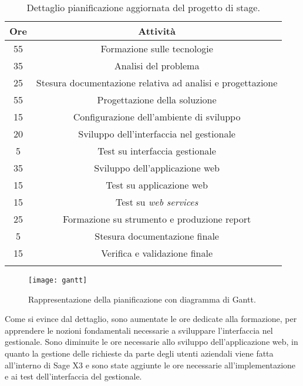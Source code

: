 \begin{center}
\begin{longtable}{ | c| c|}
	\hline
	\textbf{Ore} & \textbf{Attività}\\
	\hline
	55 & Formazione sulle tecnologie\\
	\hline
	35 & Analisi del problema\\
	\hline
	25 & Stesura documentazione relativa ad analisi e progettazione\\
	\hline
	55 & Progettazione della soluzione\\
	\hline
	15 & Configurazione dell'ambiente di sviluppo\\
	\hline
	20 & Sviluppo dell'interfaccia nel gestionale\\
	\hline
	5 & Test su interfaccia gestionale\\
	\hline
	35 & Sviluppo dell'applicazione web\\
	\hline
	15 & Test su applicazione web\\
	\hline
	15 & Test su \textit{web services}\\
	\hline
	25 & Formazione su strumento e produzione report\\
	\hline
	5 & Stesura documentazione finale\\
	\hline
	15 & Verifica e validazione finale\\
	\hline
	\caption{Dettaglio pianificazione aggiornata del progetto di stage.}
\end{longtable}
\end{center}

\begin{figure}[htbp]
	\begin{center}
		\texttt{[image: gantt]}
		\caption{Rappresentazione della pianificazione con diagramma di Gantt.}
	\end{center}
\end{figure}

Come si evince dal dettaglio, sono aumentate le ore dedicate alla formazione, per apprendere le nozioni fondamentali necessarie a sviluppare l'interfaccia nel gestionale. Sono diminuite le ore necessarie allo sviluppo dell'applicazione web, in quanto la gestione delle richieste da parte degli utenti aziendali viene fatta all'interno di Sage X3 e sono state aggiunte le ore necessarie all'implementazione e ai test dell'interfaccia del gestionale.

